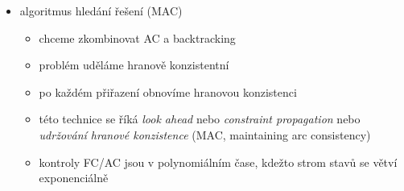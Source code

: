 \begin{itemize}
\begin{itemize}
\begin{itemize}
\begin{itemize}
\end{itemize}
\item optimální algoritmus má složitost $O(cd^2)$
\end{itemize}
\item hranová konzistence je typ lokální konzistence, negarantuje globální konzistenci
\item arc consistency (AC) vs. forward checking (FC)
\begin{itemize}
\item FC je jednodušší (a rychlejší) než AC, slouží ke stejnému účelu - zrychlení prohledávání
\item FC na základě přiřazení do proměnné (v daném kroku prohledávání) pročistí domény dosud nepřiřazených proměnných
\item AC k tomu navíc zajišťuje vzájemnou kompatibilitu domén nepřiřazených proměnných
\end{itemize}
\end{itemize}
\item algoritmus hledání řešení (MAC)
\begin{itemize}
\item chceme zkombinovat AC a backtracking
\item problém uděláme hranově konzistentní
\item po každém přiřazení obnovíme hranovou konzistenci
\item této technice se říká \textit{look ahead} nebo \textit{constraint propagation} nebo \textit{udržování hranové konzistence} (MAC, maintaining arc consistency)
\item kontroly FC/AC jsou v polynomiálním čase, kdežto strom stavů se větví exponenciálně
\end{itemize}
\end{itemize}
